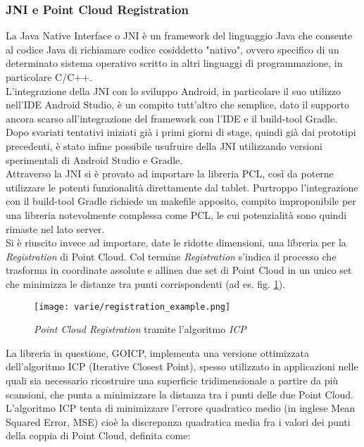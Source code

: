 \subsubsection{JNI e Point Cloud Registration}
La Java Native Interface o JNI è un framework del linguaggio Java che consente al codice Java di richiamare codice cosiddetto "nativo", ovvero specifico di un determinato sistema operativo scritto in altri linguaggi di programmazione, in particolare C/C++.\\
L'integrazione della JNI con lo sviluppo Android, in particolare il suo utilizzo nell'IDE Android Studio, è un compito tutt'altro che semplice, dato il supporto ancora scarso all'integrazione del framework con l'IDE e il build-tool Gradle.\\
Dopo svariati tentativi iniziati già i primi giorni di stage, quindi già dai prototipi precedenti, è stato infine possibile usufruire della JNI utilizzando versioni sperimentali di Android Studio e Gradle. \\
Attraverso la JNI si è provato ad importare la libreria PCL, così da poterne utilizzare le potenti funzionalità direttamente dal tablet. Purtroppo l'integrazione con il build-tool Gradle richiede un makefile apposito, compito improponibile per una libreria notevolmente complessa come PCL, le cui potenzialità sono quindi rimaste nel lato server.\\
Si è riuscito invece ad importare, date le ridotte dimensioni, una libreria per la \emph{Registration} di Point Cloud. Col termine \emph{Registration} s'indica il processo che trasforma in coordinate assolute e allinea due set di Point Cloud in un unico set che minimizza le distanze tra punti corrispondenti (ad es. fig. \ref{fig:reg_example}).
\begin{figure}[!h] 
    \centering 
    \texttt{[image: varie/registration\_example.png]} 
    \caption{\emph{Point Cloud Registration} tramite l'algoritmo \emph{ICP}}
    \label{fig:reg_example}
\end{figure}
\newline
La libreria in questione, GOICP, implementa una versione ottimizzata dell'algoritmo ICP (Iterative Closest Point), spesso utilizzato in applicazioni nelle quali sia necessario ricostruire una superficie tridimensionale a partire da più scansioni, che punta a minimizzare la distanza tra i punti delle due Point Cloud.\\
L'algoritmo ICP tenta di minimizzare l'errore quadratico medio (in inglese Mean Squared Error, MSE) cioè la discrepanza quadratica media fra i valori dei punti della coppia di Point Cloud, definita come:
